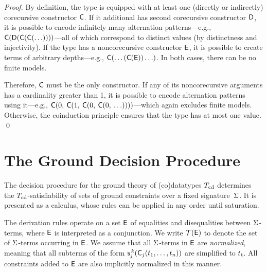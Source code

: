 \begin{report}
\begin{proof}
By definition, the type is equipped with at least one (directly or indirectly)
corecursive constructor $\textsf{C}$. If it additional has second
corecursive constructor $\textsf{D}$, it is possible to encode infinitely many
alternation patterns---e.g.,
$\textsf{C}(\textsf{D}(\textsf{C}(\textsf{C}(\ldots))))$---all of which correspond
to distinct values (by distinctness and injectivity). If the type has a
noncorecursive constructor $\textsf{E}$, it is possible to create terms of
arbitrary depths---e.g., $\textsf{C}(\ldots(\textsf{C}(\textsf{E}))\ldots)$. In
both cases, there can be no finite models.

Therefore, $\textsf{C}$ must be the only constructor.
If any of its noncorecursive arguments has a cardinality greater than 1,
it is possible to encode alternation patterns using it---e.g.,
$\textsf{C}(0,\: \textsf{C}(1,\: \textsf{C}(0,\: \textsf{C}(0,\: \ldots))))$---which
again excludes finite models. Otherwise, the coinduction principle ensures
that the type has at most one value.
\qed
\end{proof}
\end{report}


\section{The Ground Decision Procedure} %
\label{sec:a-ground-decision-procedure-for-co-datatypes}

The decision procedure for the ground theory of (co)datatypes $T_{\mathrm{cd}}$ determines the
$T_{\mathrm{cd}}$-satisfiability of sets of ground constraints over a fixed
signature~$\mathrm{\Sigma}$. It is presented as a calculus, whose rules can be applied in
any order until saturation.

The derivation rules operate on a set $\mathsf{E}$ of equalities and disequalities
between $\mathrm{\Sigma}$-terms, where $\mathsf{E}$ is interpreted as a conjunction.
We write $\mathcal{T}(\mathsf{E})$ to denote the set of $\mathrm{\Sigma}$-terms occurring in $\mathsf{E}$.
We assume that all $\mathrm{\Sigma}$-terms in $\mathsf{E}$ are \emph{normalized}, meaning that all subterms of the form $\textsf{s}^{\,k}_j( \textsf{C}_j(t_1,\ldots,t_n) )$
are simplified to $t_k$. All constraints added to $\mathsf{E}$ are also implicitly
normalized in this manner.

